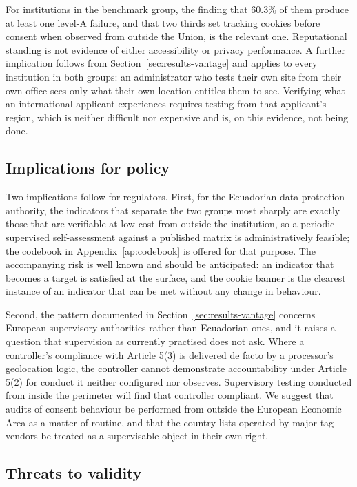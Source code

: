 \documentclass[pdflatex,sn-basic,Numbered,iicol]{sn-jnl}
\theoremstyle{thmstyleone}
\theoremstyle{thmstyletwo}
\theoremstyle{thmstylethree}
\begin{document}
	For institutions in the benchmark group, the finding that 60.3\% of them produce at least one level-A failure, and that two thirds set tracking cookies before consent when observed from outside the Union, is the relevant one. Reputational standing is not evidence of either accessibility or privacy performance. A further implication follows from Section~\ref{sec:results-vantage} and applies to every institution in both groups: an administrator who tests their own site from their own office sees only what their own location entitles them to see. Verifying what an international applicant experiences requires testing from that applicant's region, which is neither difficult nor expensive and is, on this evidence, not being done.
	
	\subsection{Implications for policy}\label{sec:discussion-policy}
	
	Two implications follow for regulators. First, for the Ecuadorian data protection authority, the indicators that separate the two groups most sharply are exactly those that are verifiable at low cost from outside the institution, so a periodic supervised self-assessment against a published matrix is administratively feasible; the codebook in Appendix~\ref{ap:codebook} is offered for that purpose. The accompanying risk is well known and should be anticipated: an indicator that becomes a target is satisfied at the surface, and the cookie banner is the clearest instance of an indicator that can be met without any change in behaviour.
	
	Second, the pattern documented in Section~\ref{sec:results-vantage} concerns European supervisory authorities rather than Ecuadorian ones, and it raises a question that supervision as currently practised does not ask. Where a controller's compliance with Article 5(3) is delivered de facto by a processor's geolocation logic, the controller cannot demonstrate accountability under Article 5(2) for conduct it neither configured nor observes. Supervisory testing conducted from inside the perimeter will find that controller compliant. We suggest that audits of consent behaviour be performed from outside the European Economic Area as a matter of routine, and that the country lists operated by major tag vendors be treated as a supervisable object in their own right.
	
	\subsection{Threats to validity}\label{sec:threats}
	
\end{document}
